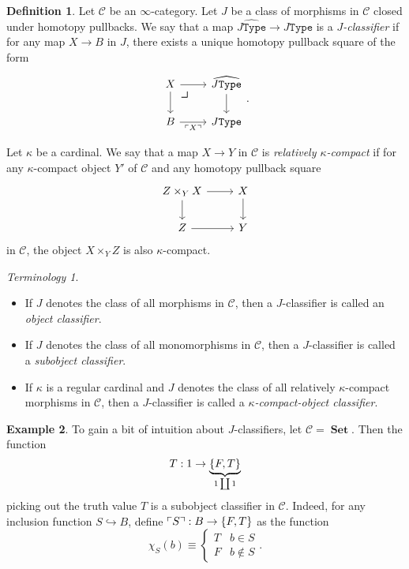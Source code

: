\documentclass[10pt,letterpaper,cm]{nupset}
\theoremstyle{definition}
\newtheorem{definition}{Definition}[subsection]
\newtheorem{exmp}[definition]{Example}
\theoremstyle{theorem}
\theoremstyle{remark}
\newtheorem*{term}{Terminology}
\newcommand{\0}{\mathbf{0}}
\newcommand{\1}{\mathbf{1}}
\newcommand{\2}{\mathbf{2}}
\DeclareMathOperator{\set}{\mathbf{Set}}
\renewcommand{\c}{\mathscr{C}}
\newcommand{\bi}{\begin{itemize}}
\newcommand{\ei}{\end{itemize}}
\begin{document}
\smallskip

\begin{definition}\label{objclass}
  Let $\c$ be an $\infty$-category. Let $J$ be a class of morphisms in $\c$ closed under homotopy pullbacks. We say that a map $\widehat{J\mathtt{Type}} \to J\mathtt{Type}$ is a \textit{$J$-classifier} if for any map $X\to B$ in $J$, there exists a unique homotopy pullback square of the form
\[
\begin{tikzcd}
X \arrow[d] \arrow[r] 
\arrow[dr, phantom, "\scalebox{1.5}{\color{black}$\lrcorner$}" , very near start, color=black]
& \widehat{J\mathtt{Type}} \arrow[d] \\
B \arrow[r, "\ulcorner{X}\urcorner"']           & J\mathtt{Type}                    
\end{tikzcd}.
\]
\end{definition}

\smallskip

  Let $\kappa$ be a cardinal. We say that a map $X \to Y$ in $\c$ is \textit{relatively $\kappa$-compact} if for any $\kappa$-compact object $Y'$ of $\c$ and any homotopy pullback square
\[
\begin{tikzcd}
Z\times_YX \arrow[d] \arrow[r] & X \arrow[d] \\
Z \arrow[r]                    & Y          
\end{tikzcd}
\] in $\c$, 
the object $X\times_{Y}Z$ is also $\kappa$-compact.

\begin{term} $ $
\bi
\item If $J$ denotes the  class of all morphisms in $\c$, then a $J$-classifier is called an \textit{object classifier}.
\item If $J$ denotes the class of all monomorphisms in $\c$, then a $J$-classifier is called a \textit{subobject classifier}.
\item If $\kappa$ is a regular cardinal and $J$ denotes the class of all relatively $\kappa$-compact morphisms in $\c$, then a $J$-classifier is called a \textit{$\kappa$-compact-object classifier}.
\ei
\end{term}

\begin{exmp}
To gain a bit of intuition about $J$-classifiers, let $\c = \set$. Then the function $$T: 1 \to \underbrace{\mleft\{F,T\mright\}}_{1 \coprod 1}$$ picking out the truth value $T$ is a subobject classifier in $\c$. Indeed, for any inclusion function $S \hookrightarrow B$, define $\ulcorner{S}\urcorner : B \to \mleft\{F,T\mright\}$ as the function 
\[
\chi_S(b) \equiv \begin{cases}
T & b\in S
\\ F & b\notin S
\end{cases}.
\]
\end{exmp}
\end{document}
